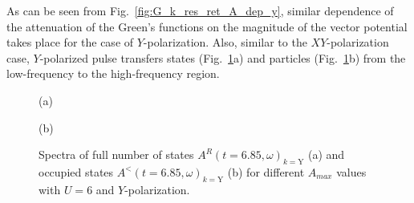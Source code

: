 As can be seen from Fig.~\ref{fig:G_k_res_ret_A_dep_y}, similar dependence of the attenuation of the Green's functions on the magnitude of the vector potential takes place for the case of $Y$-polarization.
Also, similar to the $XY$-polarization case, $Y$-polarized pulse transfers states (Fig.~\ref{fig:G_k_res_ret_A_dep_w_y}a) and particles (Fig.~\ref{fig:G_k_res_ret_A_dep_w_y}b) from the low-frequency to the high-frequency region.
\begin{figure}[h!]
\begin{minipage}[h]{0.5\linewidth}
 (a) \\
\end{minipage}
\hfill
\begin{minipage}[h]{0.5\linewidth}
 (b) \\
\end{minipage}
\caption{Spectra of full number of states $A^{R}(t=6.85,\omega)_{k= \text{Y}}$ (a) and occupied states $A^{<}(t=6.85,\omega)_{k= \text{Y}}$ (b) for different $A_{max}$ values with $U=6$ and $Y$-polarization.}
\label{fig:G_k_res_ret_A_dep_w_y}
\end{figure}

